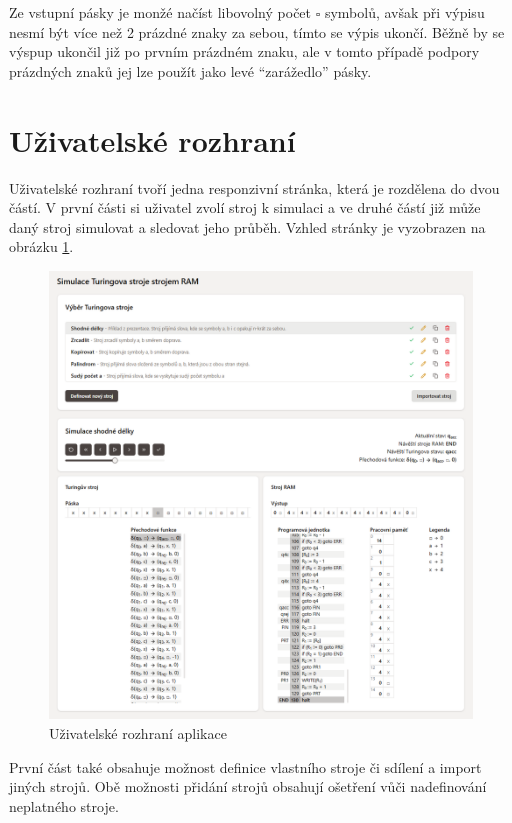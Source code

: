 Ze vstupní pásky je monžé načíst libovolný počet $\square$ symbolů, 
avšak při výpisu nesmí být více než 2 prázdné znaky za sebou, tímto se výpis ukončí.
Běžně by se výspup ukončil již po prvním prázdném znaku, 
ale v tomto případě podpory prázdných znaků jej lze použít jako levé \enquote{zarážedlo} pásky.

\section{Uživatelské rozhraní}
Uživatelské rozhraní tvoří jedna responzivní stránka, která je rozdělena do dvou částí. V první části si uživatel zvolí stroj k simulaci 
a ve druhé částí již může daný stroj simulovat a sledovat jeho průběh. Vzhled stránky je vyzobrazen na obrázku \ref{fig:ui}.

\begin{figure}[h!]
	\centering
	\includegraphics[width=1\textwidth]{Figures/ui.png}
	\caption{Uživatelské rozhraní aplikace}
	\label{fig:ui}
\end{figure}

První část také obsahuje možnost definice vlastního stroje či sdílení a import jiných strojů. 
Obě možnosti přidání strojů obsahují ošetření vůči nadefinování neplatného stroje.

